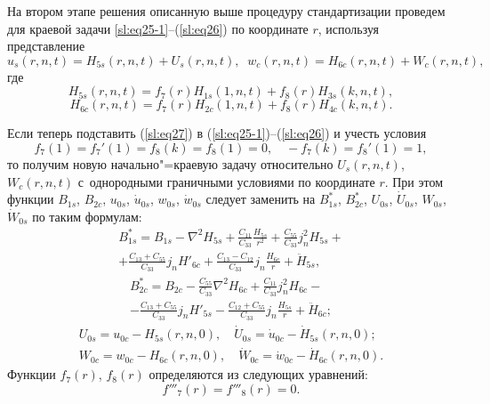 На втором этапе решения описанную выше процедуру стандартизации проведем для краевой задачи \eqref{sl:eq25-1}--(\ref{sl:eq26}) по координате $r$, используя 
представление
\begin{equation}
\label{sl:eq27}
u_s (r, n, t)=H_{5s} (r, n, t)+U_s(r, n, t), \; \; w_c (r, n, t)=H_{6c} (r, n, t)+W_c (r, n, t), 
\end{equation}
где  
$$H_{5s} (r, n, t)=f_7 (r)H_{1s} (1, n, t) + f_8 (r)H_{3s}(k, n, t),$$
$$H_{6c} (r, n, t)=f_7 (r)H_{2c} (1, n, t) + f_8 (r)H_{4c}(k, n, t).$$

Если теперь подставить (\ref{sl:eq27}) в (\ref{sl:eq25-1})--(\ref{sl:eq26}) и учесть условия 
\begin{equation}
\label{sl:eq28}
f_7 (1)=f_7 ' (1)=f_8 (k)=f_8 (1)=0, \quad -f_7 (k)=f_8 ' (1)=1, 
\end{equation}
то получим новую начально"=краевую задачу относительно $U_s(r, n, t)$, $W_c (r, n, t)$ с~однородными граничными условиями по координате $r$. 
При этом функции $B_{1s}$, $B_{2c}$, $u_{0s}$, $\dot {u}_{0s}$, $w_{0s}$, $\dot {w}_{0s}$ следует заменить на $B_{1s}^*$, $B_{2c}^*$, $U_{0s}$, $\dot {U}_{0s}$, $W_{0s}$, $\dot {W}_{0s}$ по таким формулам:
\begin{multline*}
B_{1s}^*  = B_{1s} -\nabla ^2H_{5s} +
\frac{C_{11} }{C_{33} }\frac{H_{5s}}{r^2}+
\frac{C_{55} }{C_{33} }j_n^2 H_{5s} + \\+
\frac{C_{13} + C_{55}}{C_{33} }j_n H'_{6c}  +
\frac{C_{13} - C_{12}}{C_{33} }j_n \frac{H_{6c} }{r}+\ddot {H}_{5s} , 
\end{multline*}
\begin{multline*}
B_{2c}^*  =B_{2c} -
\frac{C_{55} }{C_{33} }\nabla ^2H_{6c} +
\frac{C_{11} }{C_{33} }j_n^2 H_{6c} - \\-
\frac{C_{13} + C_{55} }{C_{33} }j_n H'_{5s}  -
\frac{C_{12} + C_{55} }{C_{33} }j_n \frac{H_{5s} }{r}+
\ddot {H}_{6c}; 
\end{multline*}
\begin{gather*}
U_{0s} =u_{0c} -H_{5s} (r, n, 0), \quad  \dot {U}_{0s} =\dot  {u}_{0c} -\dot {H}_{5s} (r, n, 0); \\ 
W_{0c} =w_{0c} -H_{6c} (r, n, 0), \quad  \dot {W}_{0c} =\dot  {w}_{0c} -\dot {H}_{6c} (r, n, 0).
\end{gather*}
Функции $f_7 (r)$, $f_8 (r)$ определяются из следующих уравнений:
\begin{equation}
\label{sl:eq29}
f'''_7 (r)=f'''_8 (r)=0.
\end{equation}

